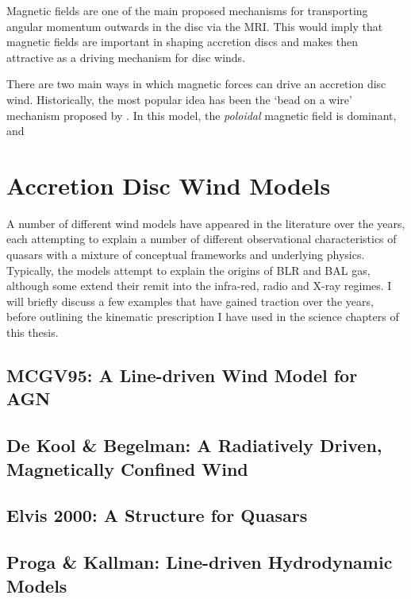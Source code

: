 Magnetic fields are one of the main proposed mechanisms for transporting
angular momentum outwards in the disc via the MRI. This would imply
that magnetic fields are important in shaping accretion discs and makes
then attractive as a driving mechanism for disc winds.

There are two main ways in which magnetic forces can drive an 
accretion disc wind. Historically, the most popular idea has been the `bead on a wire' mechanism proposed by \citep{blandfordpayne}. In this model,
the {\em poloidal} magnetic field is dominant, and 

\section{Accretion Disc Wind Models}
\label{sec:wind_models}

A number of different wind models have appeared in the literature over the 
years, each attempting to explain a number of different observational characteristics
of quasars with a mixture of conceptual frameworks and underlying physics. 
Typically, the models attempt to explain the origins of BLR and BAL gas, although
some extend their remit into the infra-red, radio and X-ray regimes.
I will briefly discuss a few examples that have gained traction over the years,
before outlining the kinematic prescription I have used in the science chapters
of this thesis. 

\subsection{MCGV95: A Line-driven Wind Model for AGN}


\subsection{De Kool & Begelman: A Radiatively Driven, Magnetically Confined Wind}


\subsection{Elvis 2000: A Structure for Quasars}


\subsection{Proga & Kallman: Line-driven Hydrodynamic Models}

